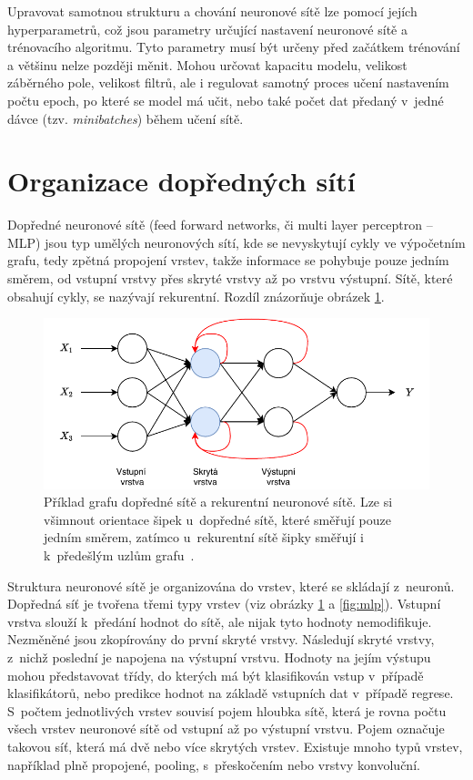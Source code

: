 Upravovat samotnou strukturu a chování neuronové sítě lze pomocí jejích hyperparametrů, což jsou parametry určující nastavení neuronové sítě a trénovacího algoritmu. Tyto parametry musí být určeny před začátkem trénování a většinu nelze později měnit. Mohou určovat kapacitu modelu, velikost záběrného pole, velikost filtrů, ale i regulovat samotný proces učení nastavením počtu epoch, po které se model má učit, nebo také počet dat předaný v~jedné dávce (tzv. \textit{minibatches}) během učení sítě.


\section{Organizace dopředných sítí}
Dopředné neuronové sítě (feed forward networks, či multi layer perceptron -- MLP) jsou typ umělých neuronových sítí, kde se nevyskytují cykly ve výpočetním grafu, tedy zpětná propojení vrstev, takže informace se pohybuje pouze jedním směrem, od vstupní vrstvy přes skryté vrstvy až po vrstvu výstupní. Sítě, které obsahují cykly, se nazývají rekurentní. Rozdíl znázorňuje obrázek \ref{fig:netcomparison}.

\begin{figure}[H]
    \centering
    \includegraphics[scale=1.0]{obrazky-figures/feedforward_vs_recurrent.pdf}
    \caption{\label{fig:netcomparison}Příklad grafu dopředné sítě a rekurentní neuronové sítě. Lze si všimnout orientace šipek u~dopředné sítě, které směřují pouze jedním směrem, zatímco u~rekurentní sítě šipky směřují i k~předešlým uzlům grafu~\cite{FFandRecNN}.}
\end{figure}

Struktura neuronové sítě je organizována do vrstev, které se skládají z~neuronů. Dopředná síť je tvořena třemi typy vrstev (viz obrázky \ref{fig:netcomparison} a \ref{fig:mlp}). Vstupní vrstva slouží k~předání hodnot do sítě, ale nijak tyto hodnoty nemodifikuje. Nezměněné jsou zkopírovány do první skryté vrstvy. Následují skryté vrstvy, z~nichž poslední je napojena na výstupní vrstvu. Hodnoty na jejím výstupu mohou představovat třídy, do kterých má být klasifikován vstup v~případě klasifikátorů, nebo predikce hodnot na základě vstupních dat v~případě regrese. S~počtem jednotlivých vrstev souvisí pojem hloubka sítě, která je rovna počtu všech vrstev neuronové sítě od vstupní až po výstupní vrstvu. Pojem  označuje takovou síť, která má dvě nebo více skrytých vrstev. Existuje mnoho typů vrstev, například plně propojené, pooling, s~přeskočením nebo vrstvy konvoluční.

